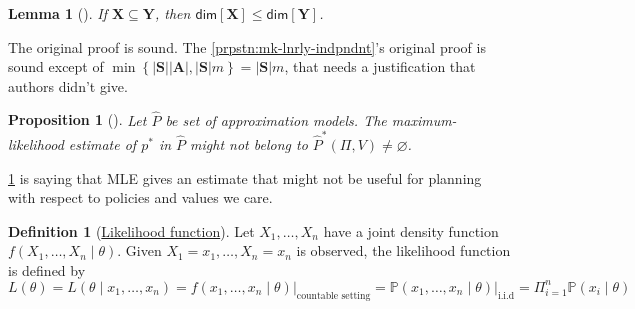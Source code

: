 \documentclass[a4paper]{article}
\theoremstyle{definition}
\newtheorem{definition}{Definition}
\theoremstyle{remark}
\theoremstyle{plain}
\newtheorem{proposition}{Proposition}
\newtheorem{lemma}{Lemma}
\newcommand{\bA}{\mathbf{A}}
\newcommand{\bS}{\mathbf{S}}
\newcommand{\bX}{\mathbf{X}}
\newcommand{\bY}{\mathbf{Y}}
\renewcommand{\P}{\mathbb{P}}
\renewcommand{\dim}{\textsf{dim}}
\begin{document}
%
\begin{lemma}[{\normalfont\citet[Lemma 4]{grimm2020value}}]
    If $\bX \subseteq \bY$, then $\dim[\bX] \leq \dim[\bY]$.
\end{lemma}
%
The original proof is sound. The \cref{prpstn:mk-lnrly-indpndnt}'s original proof is sound except of $\min \left\{|\bS||\bA|, |\bS|m\right\} = |\bS|m$, that needs a justification that authors didn't give.
%
\begin{proposition}[{\normalfont\citet[Proposition 3]{grimm2020value}}]
    \label{prpstn:ml-is-apprxmt}
    Let $\hat{P}$ be set of approximation models. The maximum-likelihood estimate of $p^*$ in $\hat{P}$ might not belong to $\hat{P}^*(\Pi, V) \neq \varnothing$.
\end{proposition}
\cref{prpstn:ml-is-apprxmt} is saying that MLE gives an estimate that might not be useful for planning with respect to policies and values we care.
%
\begin{definition}[\href{https://www.medicine.mcgill.ca/epidemiology/hanley/bios601/Likelihood/Likelihood.pdf}{Likelihood function}]
    Let $X_1, \dots, X_n$ have a joint density function $f(X_1, \dots, X_n \mid \theta)$. Given $X_1 = x_1, \dots, X_n = x_n$ is observed, the likelihood function is defined by
    \begin{equation*}
        L(\theta) = L(\theta \mid x_1, \dots, x_n) = f(x_1, \dots, x_n \mid \theta) \Big \rvert_{\text{countable setting}} = \P(x_1, \dots, x_n \mid \theta) \Big \rvert_{\text{i.i.d}} = \Pi_{i = 1}^n\P(x_i \mid \theta)
    \end{equation*}
\end{definition}
%
\end{document}
